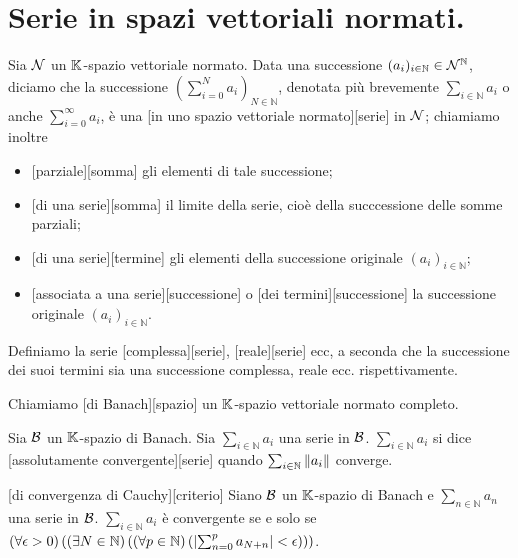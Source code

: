 \section{Serie in spazi vettoriali normati.}
\label{SuccessioniESerie_SerieInSpaziVettorialiNormati}
\begin{Definition}
	Sia $\mathcal{N}$ un $\mathbb{K}$-spazio vettoriale normato.
	Data una successione $(a_i)_{i \in \mathbb{N}} \in \mathbb{\mathcal{N}}^\mathbb{N}$, diciamo che la successione $\left ( \sum_{i = 0}^N a_i \right )_{N \in \mathbb{N}}$, denotata pi\`u brevemente $\sum_{i \in \mathbb{N}} a_i$ o anche $\sum_{i = 0}^\infty a_i$, \`e una [in uno spazio vettoriale normato][serie] in $\mathcal{N}$; chiamiamo inoltre
	\begin{itemize}
		\item {}[parziale][somma] gli elementi di tale successione;
		\item {}[di una serie][somma] il limite della serie, cio\`e della succcessione delle somme parziali;
		\item {}[di una serie][termine] gli elementi della successione originale $(a_i)_{i \in \mathbb{N}}$;
		\item {}[associata a una serie][successione] o [dei termini][successione] la successione originale $(a_i)_{i \in \mathbb{N}}$.
	\end{itemize}
	Definiamo la serie [complessa][serie], [reale][serie] ecc, a seconda che la successione dei suoi termini sia una successione complessa, reale ecc. rispettivamente.
\end{Definition}
\begin{Definition}
	Chiamiamo [di Banach][spazio] un $\mathbb{K}$-spazio vettoriale normato completo.
\end{Definition}
\begin{Definition}
	Sia $\mathcal{B}$ un $\mathbb{K}$-spazio di Banach.
	Sia $\sum_{i \in \mathbb{N}} a_i$ una serie in $\mathcal{B}$. $\sum_{i \in \mathbb{N}} a_i$ si dice [assolutamente convergente][serie] quando $\sum_{i \in \mathbb{N}} \Norm{a_i}$ converge.
\end{Definition}
\begin{Theorem}
	[di convergenza di Cauchy][criterio]
	Siano $\mathcal{B}$ un $\mathbb{K}$-spazio di Banach e $\sum_{n \in \mathbb{N}} a_n$ una serie in $\mathcal{B}$. $\sum_{i \in \mathbb{N}} a_i$ \`e convergente se e solo se $\left ( \forall \epsilon > 0 \right ) \left ( \left ( \exists N \in \mathbb{N} \right ) \left ( \left ( \forall p \in \mathbb{N} \right ) \left ( \left \lvert \sum_{n = 0}^p a_{N + n} \right \rvert < \epsilon \right ) \right ) \right )$.
\end{Theorem}

